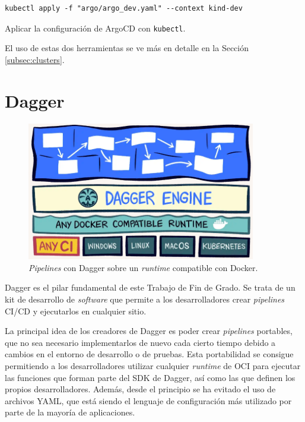 \begin{listing}[!ht]
  \begin{verbatim}
kubectl apply -f "argo/argo_dev.yaml" --context kind-dev
  \end{verbatim}
  \caption{Aplicar la configuración de ArgoCD con \texttt{kubectl}.}
  \label{lst:kubectl}
\end{listing}

El uso de estas dos herramientas se ve más en detalle en la Sección \ref{subsec:clusters}.

\section{Dagger}

\begin{figure}
  \centerline{\includegraphics[width=10cm]{figuras/dagger}}
  \caption{\textit{Pipelines} con Dagger sobre un \textit{runtime} compatible con Docker\cite{img:dagger}.}
  \label{fig:dagger}
\end{figure}

Dagger es el pilar fundamental de este Trabajo de Fin de Grado. Se trata de un kit de desarrollo de \textit{software} que permite a los desarrolladores crear \textit{pipelines} CI/CD y ejecutarlos en cualquier sitio.

La principal idea de los creadores de Dagger es poder crear \textit{pipelines} portables, que no sea necesario implementarlos de nuevo cada cierto tiempo debido a cambios en el entorno de desarrollo o de pruebas. Esta portabilidad se consigue permitiendo a los desarrolladores utilizar cualquier \textit{runtime} de OCI para ejecutar las funciones que forman parte del SDK\cite{sdk} de Dagger, así como las que definen los propios desarrolladores. Además, desde el principio se ha evitado el uso de archivos YAML, que está siendo el lenguaje de configuración más utilizado por parte de la mayoría de aplicaciones.


